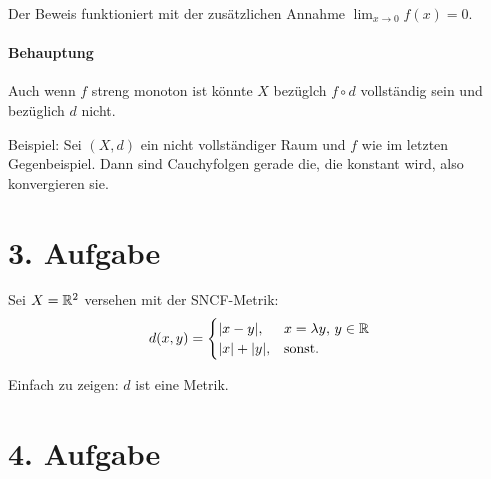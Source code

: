 \documentclass{article}
\begin{document}
Der Beweis funktioniert mit der zusätzlichen Annahme $\lim_{x\to 0} f(x) = 0$.

\paragraph{Behauptung} Auch wenn $f$ streng monoton ist könnte $X$ bezüglch $f\circ d$ vollständig sein und bezüglich $d$ nicht.

Beispiel: Sei $(X,d)$ ein nicht vollständiger Raum und $f$ wie im letzten Gegenbeispiel. Dann sind Cauchyfolgen gerade die, die konstant wird, also konvergieren sie.

\section*{3. Aufgabe}

Sei $X=\mathbb{R}^2$ versehen mit der SNCF-Metrik:
\[
d(x,y) =
\begin{cases}
|x-y|, &x = \lambda y,\, y\in \mathbb{R} \\
|x|+|y|, &\text{sonst.}
\end{cases}
\]

Einfach zu zeigen: $d$ ist eine Metrik.



\section*{4. Aufgabe}
\end{document}
